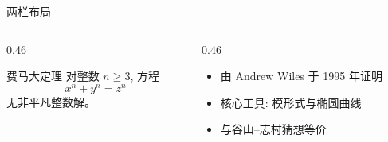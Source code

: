 
\begin{frame}{两栏布局}
  \begin{columns}[T]
    \begin{column}{0.46\textwidth}
      \begin{theorem}{费马大定理}{}
        对整数 $n \geq 3$, 方程
        \[
          x^n + y^n = z^n
        \]
        无非平凡整数解。
      \end{theorem}
    \end{column}
    \begin{column}{0.46\textwidth}
      \begin{itemize}
        \item 由 Andrew Wiles 于 1995 年证明
        \item 核心工具: 模形式与椭圆曲线
        \item 与谷山--志村猜想等价
      \end{itemize}
    \end{column}
  \end{columns}
\end{frame}
